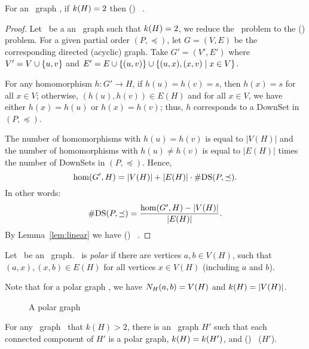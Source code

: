 \begin{lemma} \label{lem:triangle-free}
For an \RBA\ graph \mH, if \(k(H)=2\) then \chom(\mH) \mapge\ \cbis\@.
\end{lemma}

\begin{proof}
Let \mH\ be a an \RBA\ graph such that \(k(H)=2\), 
we reduce the \cdsp\ problem to the \chom(\mH) problem\@.
For a given partial order \((P,\preceq)\), let \(G=(V,E)\) be the corresponding directed
(acyclic) graph. Take \(G'=(V',E')\) where
\(V'= V \cup \{{u,v}\}\) and \(E' = E \cup \{{(u,v)}\} \cup
\{{(u,x),(x,v) \mid x\in V}\}\)\@.

For any homomorphism \(h: G' \to H\), if \(h(u)=h(v)=s\), then \(h(x)=s\) for all \(x\in V\);
otherwise, \((h(u),h(v))\in E(H)\) and for all \(x\in V\), we have either 
\(h(x)=h(u)\) or \(h(x)=h(v)\); thus,
\(h\) corresponds to a DownSet in \((P,\preceq)\)\@.

The number of homomorphisms with \(h(u)=h(v)\) is equal to \(|V(H)|\) and
the number of homomorphisms with \(h(u)\neq h(v)\) is equal to \(|E(H)|\) times the 
number of DownSets in \((P,\preceq)\)\@. Hence,
\[\hom(G',H) = |V(H)| + |E(H)|\cdot \#\mathrm{DS}(P,\preceq).\]
In other words:
\[\#\mathrm{DS}(P,\preceq) = \frac{\hom(G',H) - |V(H)|}{|E(H)|}.\] 
By Lemma~\ref{lem:linear} we have \chom(\mH) \mapge\ \cdsp\@.
\end{proof}

\begin{defi} 
Let \mH\ be an \RBA\ graph. \mH\ is \emph{polar}
if there are vertices \(a,b\in V(H)\),
such that \((a,x), (x,b) \in E(H)\) for all vertices \(x \in V(H)\) (including \(a\) and \(b\)).
\end{defi}

Note that for a polar graph \mH, we have \(N_{H}({a},{b}) = V(H)\) and \(k(H)=|V(H)|\)\@.

\begin{figure}[h]
\center{}
\caption{A polar graph}
\end{figure}

\begin{lemma} \label{lem:k-fixing}
For any \RBA\ graph \mH\ that \(k(H) > 2\), there is an \RBA\ graph
\(H'\) such that each connected component of \(H'\) is a
polar graph, \(k(H) = k(H')\), and
\chom(\mH) \mapge\ \chom(\(H'\)).
\end{lemma}

